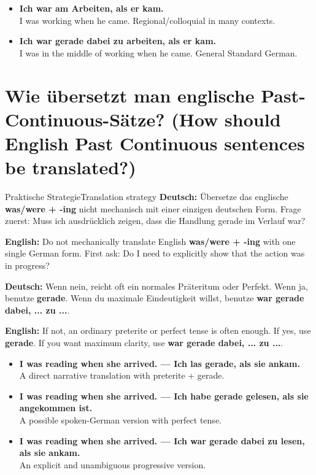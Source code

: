 \documentclass[a4paper,11pt]{article}
\newcommand{\GermanText}[1]{\textbf{Deutsch: }#1\par}
\newcommand{\EnglishText}[1]{{\small\color{SoftGray}\textbf{English: }#1\par}}
\newcommand{\ExampleItem}[2]{\item \textbf{#1}\\{\small\color{SoftGray}#2}}
\begin{document}
        \begin{exbox}
            \begin{itemize}
                \ExampleItem{Ich war am Arbeiten, als er kam.}{I was working when he came. Regional/colloquial in many contexts.}
                \ExampleItem{Ich war gerade dabei zu arbeiten, als er kam.}{I was in the middle of working when he came. General Standard German.}
            \end{itemize}
        \end{exbox}

    \section{Wie übersetzt man englische Past-Continuous-Sätze? \textnormal{(How should English Past Continuous sentences be translated?)}}

        \begin{grammarentry}{Praktische Strategie}{Translation strategy}
            \GermanText{Übersetze das englische \textbf{was/were + -ing} nicht mechanisch mit einer einzigen deutschen Form. Frage zuerst: Muss ich ausdrücklich zeigen, dass die Handlung gerade im Verlauf war?}
            \EnglishText{Do not mechanically translate English \textbf{was/were + -ing} with one single German form. First ask: Do I need to explicitly show that the action was in progress?}

            \GermanText{Wenn nein, reicht oft ein normales Präteritum oder Perfekt. Wenn ja, benutze \textbf{gerade}. Wenn du maximale Eindeutigkeit willst, benutze \textbf{war gerade dabei, ... zu ...}.}
            \EnglishText{If not, an ordinary preterite or perfect tense is often enough. If yes, use \textbf{gerade}. If you want maximum clarity, use \textbf{war gerade dabei, ... zu ...}.}
        \end{grammarentry}

        \begin{exbox}
            \begin{itemize}
                \ExampleItem{I was reading when she arrived. --- Ich las gerade, als sie ankam.}{A direct narrative translation with preterite + gerade.}
                \ExampleItem{I was reading when she arrived. --- Ich habe gerade gelesen, als sie angekommen ist.}{A possible spoken-German version with perfect tense.}
                \ExampleItem{I was reading when she arrived. --- Ich war gerade dabei zu lesen, als sie ankam.}{An explicit and unambiguous progressive version.}
            \end{itemize}
        \end{exbox}
\end{document}
